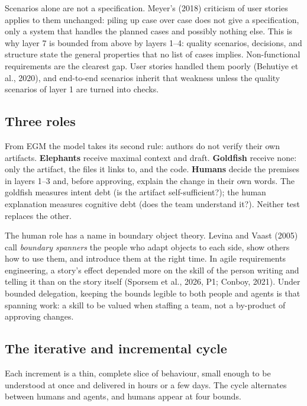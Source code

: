 \documentclass[11pt]{article}
\begin{document}
Scenarios alone are not a specification. Meyer's (2018) criticism of user stories applies to them unchanged: piling up case over case does not give a specification, only a system that handles the planned cases and possibly nothing else. This is why layer 7 is bounded from above by layers 1--4: quality scenarios, decisions, and structure state the general properties that no list of cases implies. Non-functional requirements are the clearest gap. User stories handled them poorly (Behutiye et al., 2020), and end-to-end scenarios inherit that weakness unless the quality scenarios of layer 1 are turned into checks.

\subsection{Three roles}

From EGM the model takes its second rule: authors do not verify their own artifacts. \textbf{Elephants} receive maximal context and draft. \textbf{Goldfish} receive none: only the artifact, the files it links to, and the code. \textbf{Humans} decide the premises in layers 1--3 and, before approving, explain the change in their own words. The goldfish measures intent debt (is the artifact self-sufficient?); the human explanation measures cognitive debt (does the team understand it?). Neither test replaces the other.

The human role has a name in boundary object theory. Levina and Vaast (2005) call \emph{boundary spanners} the people who adapt objects to each side, show others how to use them, and introduce them at the right time. In agile requirements engineering, a story's effect depended more on the skill of the person writing and telling it than on the story itself (Sporsem et al., 2026, P1; Conboy, 2021). Under bounded delegation, keeping the bounds legible to both people and agents is that spanning work: a skill to be valued when staffing a team, not a by-product of approving changes.

\subsection{The iterative and incremental cycle}

Each increment is a thin, complete slice of behaviour, small enough to be understood at once and delivered in hours or a few days. The cycle alternates between humans and agents, and humans appear at four bounds.
\end{document}
